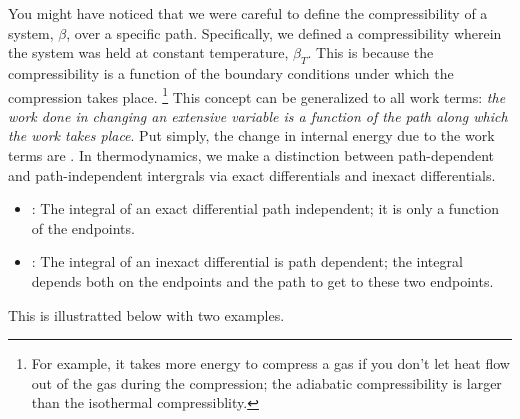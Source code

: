 \documentclass[12pt]{article}
\begin{document}
You might have noticed that we were careful to define the compressibility of a system, $\beta$, over a specific path. Specifically, we defined a compressibility wherein the system was held at constant temperature, $\beta_T$. This is because the compressibility is a function of the boundary conditions under which the compression takes place. \footnote{For example, it takes more energy to compress a gas if you don't let heat flow out of the gas during the compression; the adiabatic compressibility is larger than the isothermal compressiblity.} This concept can be generalized to all work terms: \emph{the work done in changing an extensive variable is a function of the path along which the work takes place}. Put simply, the change in internal energy due to the work terms are . In thermodynamics, we make a distinction between path-dependent and path-independent intergrals via exact differentials and inexact differentials. 
\begin{itemize}
\item {}: The integral of an exact differential path independent; it is only a function of the endpoints.
\item {}: The integral of an inexact differential is path dependent; the integral depends both on the endpoints and the path to get to these two endpoints.
\end{itemize}
This is illustratted below with two examples.
\end{document}
